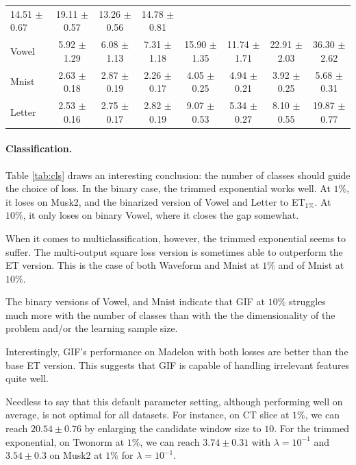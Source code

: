 \documentclass{article}
\newcommand{\bestA}{\cellcolor{orange}}
\newcommand{\bestB}{\cellcolor{dodgerblue}}
\begin{document}
\begin{table}[t]
\begin{center}
\begin{footnotesize}
\begin{sc}
\begin{tabular}{l|c|ccc|ccc}
14.51 $\pm$ 0.67 & 19.11 $\pm$ 0.57 & \bestB 13.26 $\pm$ 0.56 & 14.78 $\pm$ 
0.81 \\
Vowel & 5.92 $\pm$ 1.29 & \bestA 6.08 $\pm$ 1.13 & 7.31 $\pm$ 1.18 & 15.90 
$\pm$ 1.35 & \bestB 11.74 $\pm$ 1.71 & 22.91 $\pm$ 2.03 & 36.30 $\pm$ 2.62 \\
Mnist & 2.63 $\pm$ 0.18 & 2.87 $\pm$ 0.19 & \bestA 2.26 $\pm$ 0.17 & 4.05 $\pm$ 
0.25 & 4.94 $\pm$ 0.21 & \bestB 3.92 $\pm$ 0.25 & 5.68 $\pm$ 0.31 \\
Letter & 2.53 $\pm$ 0.16 & \bestA 2.75 $\pm$ 0.17 & 2.82 $\pm$ 0.19 & 9.07 
$\pm$ 0.53 & \bestB 5.34 $\pm$ 0.27 & 8.10 $\pm$ 0.55 & 19.87 $\pm$ 0.77 \\
\hline
\end{tabular}
\end{sc}
\end{footnotesize}
\end{center}
\vskip -0.2in
\end{table}


\paragraph{Classification.}
Table \ref{tab:cls} draws an interesting conclusion: the number of classes 
should guide the choice of loss. In the binary case, the trimmed exponential 
works well. At $1\%$, it loses on Musk2, and the binarized version of 
Vowel and Letter to ET$_{1\%}$. At $10\%$, it only loses on binary Vowel, where 
it closes the gap somewhat.

When it comes to multiclassification, however, the trimmed exponential seems to 
suffer. The multi-output square loss version is sometimes able to outperform 
the ET version. This is the case of both Waveform and Mnist at $1\%$ and of 
Mnist at $10\%$. 

The binary versions of Vowel, and Mnist indicate that GIF at $10\%$ 
struggles much more with the number of classes than with the the dimensionality 
of the problem and/or the learning sample size. 

Interestingly, GIF's performance on Madelon with both losses are better than 
the base ET version. This suggests that GIF is capable of handling irrelevant 
features quite well.

Needless to say that this default parameter setting, although performing well 
on average, is not optimal for all datasets. For instance, on CT slice at 
$1\%$, we can reach $20.54 \pm 0.76$ by enlarging the candidate window size 
to $10$. 
For the trimmed exponential, on Twonorm at $1\%$, we can reach $3.74 \pm
0.31$ with $\lambda=10^{-1}$ and $3.54 \pm 0.3$ on Musk2 at $1\%$ for 
$\lambda=10^{-1}$.
\end{document}
